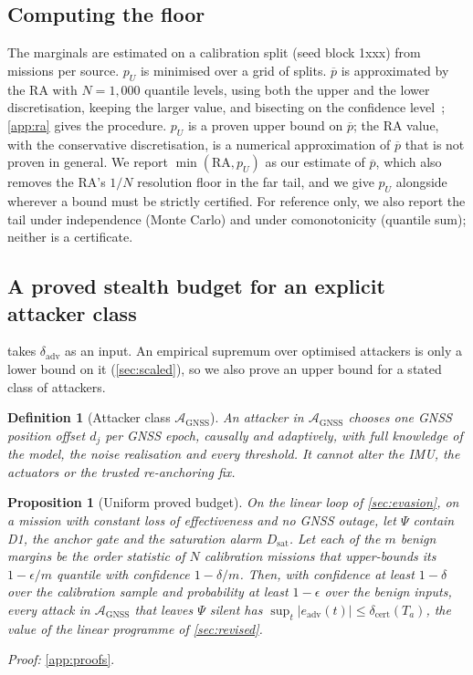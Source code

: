 \documentclass[letterpaper,twocolumn,10pt]{article}
\newcommand{\dadv}{\delta_{\mathrm{adv}}}
\newcommand{\pbar}{\overline{p}}
\newtheorem{definition}{Definition}
\newtheorem{proposition}{Proposition}
\theoremstyle{remark}
\begin{document}
\subsection{Computing the floor}
The marginals are estimated on a calibration split (seed block 1xxx) from
\nCalMissions{} missions per source. $p_U$ is minimised over a grid of splits.
$\pbar$ is approximated by the RA with $N=1{,}000$ quantile levels, using both the
upper and the lower discretisation, keeping the larger value, and bisecting on
the confidence level~\cite{embrechts2013var,hofert2020}; \cref{app:ra} gives the
procedure. $p_U$ is a proven upper
bound on $\pbar$; the RA value, with the conservative discretisation, is a
numerical approximation of $\pbar$ that is not proven in general. We report
$\min(\mathrm{RA},p_U)$ as our estimate of $\pbar$, which also removes the RA's
$1/N$ resolution floor in the far tail, and we give $p_U$ alongside wherever a
bound must be strictly certified. For reference only, we
also report the tail under independence (Monte Carlo) and under comonotonicity
(quantile sum); neither is a certificate.

\subsection{A proved stealth budget for an explicit attacker class}
\label{sec:certbudget}
 takes $\dadv$ as an input. An empirical supremum over
optimised attackers is only a lower bound on it (\cref{sec:scaled}), so we
also prove an upper bound for a stated class of attackers.

\begin{definition}[Attacker class $\mathcal A_{\mathrm{GNSS}}$]
An attacker in $\mathcal A_{\mathrm{GNSS}}$ chooses one GNSS position offset $d_j$
per GNSS epoch, causally and adaptively, with full knowledge of the model,
the noise realisation and every threshold. It cannot alter the IMU, the actuators
or the trusted re-anchoring fix.
\end{definition}

\begin{proposition}[Uniform proved budget]
\label{prop:certbudget}
On the linear loop of \cref{sec:evasion}, on a mission with constant loss of
effectiveness and no GNSS outage, let
$\Psi$ contain D1, the anchor gate and the saturation alarm $D_{\mathrm{sat}}$.
Let each of the $m$ benign margins be the order statistic of $N$ calibration
missions that upper-bounds its $1-\epsilon/m$ quantile with confidence
$1-\delta/m$. Then, with confidence at least $1-\delta$ over the calibration sample
and probability at least $1-\epsilon$ over the benign inputs, every attack in $\mathcal A_{\mathrm{GNSS}}$ that leaves $\Psi$ silent has
$\sup_t|e_{\mathrm{adv}}(t)|\le\delta_{\mathrm{cert}}(T_a)$, the value of the
linear programme of \cref{sec:revised}.
\end{proposition}
\noindent\emph{Proof:} \cref{app:proofs}.
\end{document}
